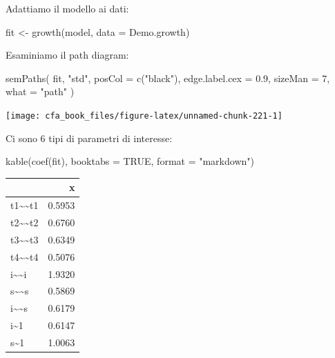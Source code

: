 \documentclass[
  11pt,
]{krantz}
\makeatletter
\newenvironment{Shaded}{\begin{snugshade}}{\end{snugshade}}
\newcommand{\AttributeTok}[1]{\textcolor[rgb]{0.61,0.61,0.61}{#1}}
\newcommand{\ConstantTok}[1]{\textcolor[rgb]{0,0,0}{#1}}
\newcommand{\DecValTok}[1]{\textcolor[rgb]{0.06,0.06,0.06}{#1}}
\newcommand{\FloatTok}[1]{\textcolor[rgb]{0.06,0.06,0.06}{#1}}
\newcommand{\FunctionTok}[1]{\textcolor[rgb]{0,0,0}{#1}}
\newcommand{\NormalTok}[1]{#1}
\newcommand{\OtherTok}[1]{\textcolor[rgb]{0.37,0.37,0.37}{#1}}
\newcommand{\StringTok}[1]{\textcolor[rgb]{0.5,0.5,0.5}{#1}}
\newenvironment{kframe}{%
\medskip{}
\setlength{\fboxsep}{.8em}
 \def\at@end@of@kframe{}%
 \ifinner\ifhmode%
  \def\at@end@of@kframe{\end{minipage}}%
  \begin{minipage}{\columnwidth}%
 \fi\fi%
 \def\FrameCommand##1{\hskip\@totalleftmargin \hskip-\fboxsep
 \colorbox{shadecolor}{##1}\hskip-\fboxsep
     \hskip-\linewidth \hskip-\@totalleftmargin \hskip\columnwidth}%
 \MakeFramed {\advance\hsize-\width
   \@totalleftmargin\z@ \linewidth\hsize
   \@setminipage}}%
 {\par\unskip\endMakeFramed%
 \at@end@of@kframe}
\renewenvironment{Shaded}{\begin{kframe}}{\end{kframe}}
\theoremstyle{definition}
\theoremstyle{definition}
\theoremstyle{definition}
\theoremstyle{definition}
\theoremstyle{remark}
\makeatother
\begin{document}
Adattiamo il modello ai dati:

\begin{Shaded}
\begin{Highlighting}[]
\NormalTok{fit }\OtherTok{\textless{}{-}} \FunctionTok{growth}\NormalTok{(model, }\AttributeTok{data =}\NormalTok{ Demo.growth)}
\end{Highlighting}
\end{Shaded}

Esaminiamo il path diagram:

\begin{Shaded}
\begin{Highlighting}[]
\FunctionTok{semPaths}\NormalTok{(}
\NormalTok{  fit, }\StringTok{"std"}\NormalTok{,}
  \AttributeTok{posCol =} \FunctionTok{c}\NormalTok{(}\StringTok{"black"}\NormalTok{),}
  \AttributeTok{edge.label.cex =} \FloatTok{0.9}\NormalTok{,}
  \AttributeTok{sizeMan =} \DecValTok{7}\NormalTok{,}
  \AttributeTok{what =} \StringTok{"path"}
\NormalTok{)}
\end{Highlighting}
\end{Shaded}

\begin{center}\texttt{[image: cfa\_book\_files/figure-latex/unnamed-chunk-221-1]} \end{center}

Ci sono 6 tipi di parametri di interesse:

\begin{Shaded}
\begin{Highlighting}[]
\FunctionTok{kable}\NormalTok{(}\FunctionTok{coef}\NormalTok{(fit), }\AttributeTok{booktabs =} \ConstantTok{TRUE}\NormalTok{, }\AttributeTok{format =} \StringTok{"markdown"}\NormalTok{)}
\end{Highlighting}
\end{Shaded}

\begin{longtable}[]{@{}lr@{}}
\toprule
& x \\
\midrule
\endhead
t1\textasciitilde\textasciitilde t1 & 0.5953 \\
t2\textasciitilde\textasciitilde t2 & 0.6760 \\
t3\textasciitilde\textasciitilde t3 & 0.6349 \\
t4\textasciitilde\textasciitilde t4 & 0.5076 \\
i\textasciitilde\textasciitilde i & 1.9320 \\
s\textasciitilde\textasciitilde s & 0.5869 \\
i\textasciitilde\textasciitilde s & 0.6179 \\
i\textasciitilde1 & 0.6147 \\
s\textasciitilde1 & 1.0063 \\
\bottomrule
\end{longtable}
\end{document}
